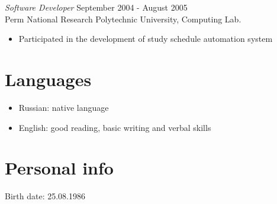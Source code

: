 \documentclass[12pt]{res}
\begin{document}
\begin{resume}
{\sl Software Developer} \hfill September 2004 - August 2005 \\
Perm National Research Polytechnic University, Computing Lab.
\begin{itemize}
\item Participated in the development of study schedule automation system
\end{itemize} 

\section{Languages}
\begin{itemize}
\item Russian: native language
\item English: good reading, basic writing and verbal skills
\end{itemize}

\section{Personal info}
Birth date: 25.08.1986

\end{resume}
\end{document}
